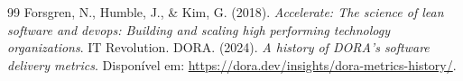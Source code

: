\documentclass[12pt]{article}
\begin{document}

\begin{thebibliography}{99}
Forsgren, N., Humble, J., \& Kim, G. (2018). \textit{Accelerate: The science of lean software and devops: Building and scaling high performing technology organizations}. IT Revolution.
DORA. (2024). \textit{A history of DORA's software delivery metrics}. Disponível em: \url{https://dora.dev/insights/dora-metrics-history/}.
\end{thebibliography}
\end{document}
